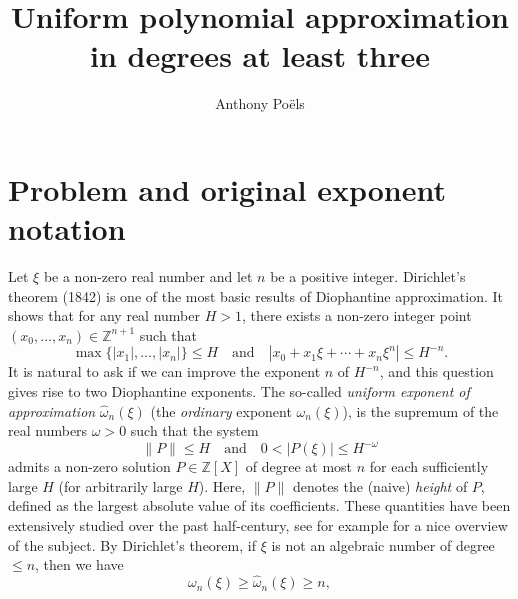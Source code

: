 \documentclass[10pt,a4paper]{amsart}
\numberwithin{equation}{section}
\newcommand\bZ{\mathbb{Z}}
\newcommand\homega{\widehat{\omega}}\newcommand\HH{\mathcal{H}}
\newcommand{\normH}[1]{\|#1\|}
\newcommand\AND{\quad\text{and}\quad}
\theoremstyle{definition}
\theoremstyle{plain}
\begin{document}
\title{Uniform polynomial approximation in degrees at least three}
\author{Anthony Poëls}
\date{}
\maketitle
\section{Problem and original exponent notation}
Let $\xi$ be a non-zero real number and let $n$ be a positive integer. Dirichlet's theorem (1842) is one of the most basic results of Diophantine approximation. It shows that for any real number $H > 1$, there exists a non-zero integer point $(x_0,\dots,x_n)\in\bZ^{n+1}$ such that
\begin{equation}
\label{eq: Dirichlet system}
\max\big\{|x_1|,\dots,|x_n|\big\} \leq H \AND |x_0 + x_1\xi + \cdots + x_n\xi^n| \leq H^{-n}.
\end{equation}
It is natural to ask if we can improve the exponent $n$ of $H^{-n}$, and this question gives rise to two Diophantine exponents. The so-called \emph{uniform exponent of approximation} $\homega_n(\xi)$ (\resp the \emph{ordinary} exponent $\omega_n(\xi)$), is the supremum of the real numbers $\omega > 0$ such that the system
\begin{equation*}
\normH{P} \leq H \AND 0 <|P(\xi)| \leq H^{-\omega}
\end{equation*}
admits a non-zero solution $P\in\bZ[X]$ of degree at most $n$ for each sufficiently large $H$ (\resp for arbitrarily large $H$). Here, $\normH{P}$ denotes the (naive) \emph{height} of $P$, defined as the largest absolute value of its coefficients. These quantities have been extensively studied over the past half-century, see for example \cite{bugeaud2015exponents} for a nice overview of the subject. By Dirichlet's theorem, if $\xi$ is not an algebraic number of degree $\leq n$, then we have
\[
\omega_n(\xi) \geq \homega_n(\xi) \geq n,
\]
\end{document}
